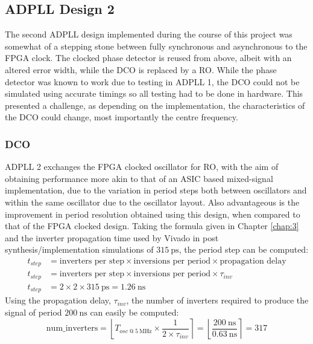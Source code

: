 \subsection{\acs{ADPLL} Design 2}
The second \ac{ADPLL} design implemented during the course of this project was somewhat of a stepping stone between fully synchronous and asynchronous to the \ac{FPGA} clock. The clocked phase detector is reused from above, albeit with an altered error width, while the \ac{DCO} is replaced by a \acl{RO}. While the phase detector was known to work due to testing in \ac{ADPLL} 1, the \ac{DCO} could not be simulated using accurate timings so all testing had to be done in hardware. This presented a challenge, as depending on the implementation, the characteristics of the \ac{DCO} could change, most importantly the centre frequency. 

\subsubsection{\acl{DCO}}
\ac{ADPLL} 2 exchanges the \ac{FPGA} clocked oscillator for \ac{RO}, with the aim of obtaining performance more akin to that of an \ac{ASIC} based mixed-signal implementation, due to the variation in period steps both between oscillators and within the same oscillator due to the oscillator layout. Also advantageous is the improvement in period resolution obtained using this design, when compared to that of the \ac{FPGA} clocked design. Taking the formula given in Chapter \ref{chap:3} and the inverter propagation time used by Vivado in post synthesis/implementation simulations of $315~\si{\pico\second}$, the period step can be computed:
\begin{align}
t_{step} &= \text{inverters per step}\times\text{inversions per period}\times\text{propagation delay} \\
t_{step} &= \text{inverters per step}\times\text{inversions per period}\times\tau_{inv} \\
t_{step} &= 2\times 2\times 315~\si{\pico\second} = 1.26~\si{\nano\second}
\end{align}
Using the propagation delay, $\tau_{inv}$, the number of inverters required to produce the signal of period $200~\si{\nano\second}$ can easily be computed:
\begin{equation}
\text{num\_inverters} = \left \lfloor{ T_{osc~@~5~\si{\mega\hertz}}\times \frac{1}{2\times\tau_{inv}}}\right \rceil = \left \lfloor{ \frac{200~\si{\nano\second}}{0.63~\si{\nano\second}}}\right \rceil = 317
\end{equation}

